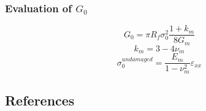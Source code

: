 \documentclass[first,firstsupp,lastsupp,handout,last,hyperref,table]{ETHclass}
\begin{document}



\begin{frame}
\frametitle{\small Evaluation of $G_{0}$}
\vspace{-0.7cm}
\footnotesize
\centering
\captionsetup[figure]{font=scriptsize,labelfont=scriptsize}
\begin{equation}
G_{0}=\pi R_{f}\sigma^{2}_{0}\frac{1+k_{m}}{8G_{m}}
\end{equation}
\begin{equation}
k_{m}=3-4\nu_{m}
\end{equation}
\begin{equation}
\sigma_{0}^{undamaged}=\frac{E_{m}}{1-\nu^{2}_{m}}\varepsilon_{xx}
\end{equation}%
\end{frame}



%        
%          

\subsection{References}
\end{document}
